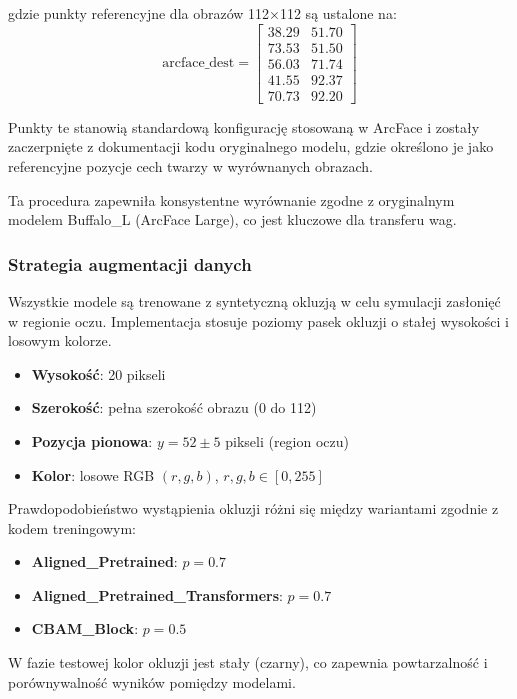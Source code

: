 gdzie punkty referencyjne dla obrazów 112×112 są ustalone na:
\begin{equation}
\text{arcface\_dest} = \begin{bmatrix} 38.29 & 51.70 \\ 73.53 & 51.50 \\ 56.03 & 71.74 \\ 41.55 & 92.37 \\ 70.73 & 92.20 \end{bmatrix}
\end{equation}

Punkty te stanowią standardową konfigurację stosowaną w ArcFace i zostały zaczerpnięte z dokumentacji kodu oryginalnego modelu, gdzie określono je jako referencyjne pozycje cech twarzy w wyrównanych obrazach.

Ta procedura zapewniła konsystentne wyrównanie zgodne z oryginalnym modelem Buffalo\_L (ArcFace Large), co jest kluczowe dla transferu wag.

\subsubsection{Strategia augmentacji danych}
\label{subsec:augmentation}

Wszystkie modele są trenowane z syntetyczną okluzją w celu symulacji zasłonięć w regionie oczu. Implementacja stosuje poziomy pasek okluzji o stałej wysokości i losowym kolorze.

\begin{itemize}
    \item \textbf{Wysokość}: 20 pikseli
    \item \textbf{Szerokość}: pełna szerokość obrazu (0 do 112)
    \item \textbf{Pozycja pionowa}: $y = 52 \pm 5$ pikseli (region oczu)
    \item \textbf{Kolor}: losowe RGB $(r, g, b)$, $r,g,b \in [0, 255]$
\end{itemize}

Prawdopodobieństwo wystąpienia okluzji różni się między wariantami zgodnie z kodem treningowym:
\begin{itemize}
    \item \textbf{Aligned\_Pretrained}: $p=0.7$
    \item \textbf{Aligned\_Pretrained\_Transformers}: $p=0.7$
    \item \textbf{CBAM\_Block}: $p=0.5$
\end{itemize}

W fazie testowej kolor okluzji jest stały (czarny), co zapewnia powtarzalność i porównywalność wyników pomiędzy modelami.